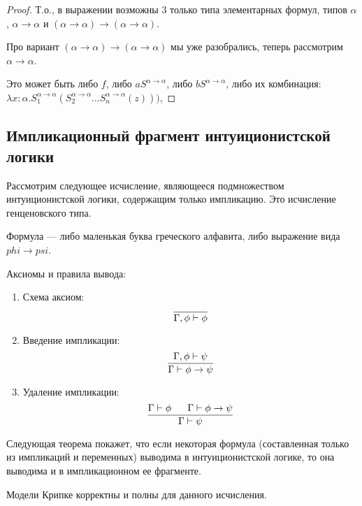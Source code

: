 \begin{proof}
Т.о., в выражении возможны 3 только типа элементарных формул, типов $\alpha$, $\alpha\rightarrow\alpha$ и
$(\alpha\rightarrow\alpha)\rightarrow(\alpha\rightarrow\alpha)$.

Про вариант $(\alpha\rightarrow\alpha)\rightarrow(\alpha\rightarrow\alpha)$ мы уже разобрались, теперь
рассмотрим $\alpha\rightarrow\alpha$.

Это может быть либо $f$, либо $a S^{\alpha\rightarrow\alpha}$, либо $b S^{\alpha\rightarrow\alpha}$,
либо их комбинация: 
$\lambda x:\alpha.S_1^{\alpha\rightarrow\alpha}(S_2^{\alpha\rightarrow\alpha}\dots S_n^{\alpha\rightarrow\alpha}(z)))$,


\end{proof}

\subsection{Импликационный фрагмент интуиционистской логики}

Рассмотрим следующее исчисление, являющееся подмножеством интуиционистской
логики, содержащим только импликацию. Это исчисление генценовского типа.

Формула --- либо маленькая буква греческого алфавита, либо выражение вида
$phi \rightarrow psi$.

Аксиомы и правила вывода:

\begin{enumerate}
\item Схема аксиом:
$$\infer{\Gamma, \phi \vdash \phi}{}$$
\item Введение импликации:
$$\infer{\Gamma \vdash \phi \rightarrow \psi}{\Gamma, \phi \vdash \psi}$$
\item Удаление импликации:
$$\infer{\Gamma \vdash \psi}{\Gamma\vdash\phi~~~~~\Gamma\vdash\phi\rightarrow\psi}$$
\end{enumerate}

Следующая теорема покажет, что если некоторая формула (составленная только из
импликаций и переменных) выводима в интуиционистской логике, то она выводима
и в импликационном ее фрагменте.

\begin{theorem}
Модели Крипке корректны и полны для данного исчисления.
\end{theorem}

